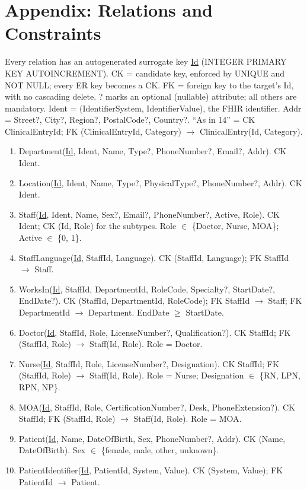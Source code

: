 \documentclass[sigconf]{acmart}
\begin{document}
\section*{Appendix: Relations and Constraints}
\footnotesize
Every relation has an autogenerated surrogate key \underline{Id} (INTEGER PRIMARY KEY AUTOINCREMENT). CK = candidate key, enforced by UNIQUE and NOT NULL; every ER key becomes a CK. FK = foreign key to the target's Id, with no cascading delete. ? marks an optional (nullable) attribute; all others are mandatory. Ident = (IdentifierSystem, IdentifierValue), the FHIR identifier. Addr = Street?, City?, Region?, PostalCode?, Country?. ``As in 14'' = CK ClinicalEntryId; FK (ClinicalEntryId, Category) $\to$ ClinicalEntry(Id, Category).
\begin{enumerate}\setlength{\itemsep}{0pt}\setlength{\parskip}{0pt}
\item Department(\underline{Id}, Ident, Name, Type?, PhoneNumber?, Email?, Addr). CK Ident.
\item Location(\underline{Id}, Ident, Name, Type?, PhysicalType?, PhoneNumber?, Addr). CK Ident.
\item Staff(\underline{Id}, Ident, Name, Sex?, Email?, PhoneNumber?, Active, Role). CK Ident; CK (Id, Role) for the subtypes. Role $\in$ \{Doctor, Nurse, MOA\}; Active $\in$ \{0, 1\}.
\item StaffLanguage(\underline{Id}, StaffId, Language). CK (StaffId, Language); FK StaffId $\to$ Staff.
\item WorksIn(\underline{Id}, StaffId, DepartmentId, RoleCode, Specialty?, StartDate?, EndDate?). CK (StaffId, DepartmentId, RoleCode); FK StaffId $\to$ Staff; FK DepartmentId $\to$ Department. EndDate $\ge$ StartDate.
\item Doctor(\underline{Id}, StaffId, Role, LicenseNumber?, Qualification?). CK StaffId; FK (StaffId, Role) $\to$ Staff(Id, Role). Role = Doctor.
\item Nurse(\underline{Id}, StaffId, Role, LicenseNumber?, Designation). CK StaffId; FK (StaffId, Role) $\to$ Staff(Id, Role). Role = Nurse; Designation $\in$ \{RN, LPN, RPN, NP\}.
\item MOA(\underline{Id}, StaffId, Role, CertificationNumber?, Desk, PhoneExtension?). CK StaffId; FK (StaffId, Role) $\to$ Staff(Id, Role). Role = MOA.
\item Patient(\underline{Id}, Name, DateOfBirth, Sex, PhoneNumber?, Addr). CK (Name, DateOfBirth). Sex $\in$ \{female, male, other, unknown\}.
\item PatientIdentifier(\underline{Id}, PatientId, System, Value). CK (System, Value); FK PatientId $\to$ Patient.

\end{enumerate}
\end{document}
